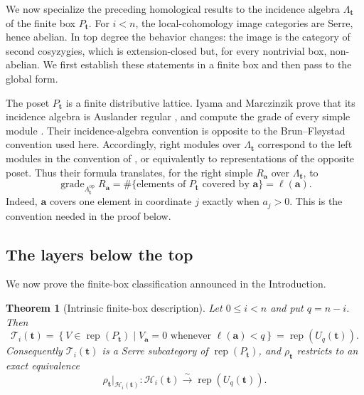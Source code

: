 \documentclass[12pt,reqno]{amsart}
\newtheorem{theorem}{Theorem}[section]
\theoremstyle{definition}
\theoremstyle{remark}
\newcommand{\Rep}{\operatorname{rep}}
\newcommand{\grade}{\operatorname{grade}}
\begin{document}
We now specialize the preceding homological results to the incidence algebra
$\Lambda_{\mathbf t}$ of the finite box $P_{\mathbf t}$.  For $i<n$, the
local-cohomology image categories are Serre, hence abelian.  In top degree the
behavior changes: the image is the category of second cosyzygies, which is
extension-closed but, for every nontrivial box, non-abelian.  We first establish
these statements in a finite box and then pass to the global form.

The poset $P_{\mathbf t}$ is a finite distributive lattice.  Iyama and
Marczinzik prove that its incidence algebra is Auslander regular
\cite[Theorem~3.2]{IM}, and compute the grade of every simple module
\cite[Corollary~3.3]{IM}.  Their incidence-algebra convention is opposite to
the Brun--Fl\o ystad convention used here.  Accordingly, right modules over
$\Lambda_{\mathbf t}$ correspond to the left modules in the convention of
\cite{IM}, or equivalently to representations of the opposite poset.  Thus
their formula translates, for the right simple $R_{\mathbf a}$ over
$\Lambda_{\mathbf t}$, to
\[
\grade_{\Lambda_{\mathbf t}^{\mathrm{op}}}R_{\mathbf a}
=
\#\{\text{elements of $P_{\mathbf t}$ covered by $\mathbf a$}\}
=
\ell(\mathbf a).
\]
Indeed, $\mathbf a$ covers one element in coordinate $j$ exactly when
$a_j>0$.  This is the convention needed in the proof below.

\subsection{The layers below the top}

We now prove the finite-box classification announced in the Introduction.

\begin{theorem}[Intrinsic finite-box description]\label{thm:finite-intrinsic}
Let $0\le i<n$ and put $q=n-i$.  Then
\[
\boxed{
\mathcal T_i(\mathbf t)
=
\left\{
V\in\Rep(P_{\mathbf t})\mid
V_{\mathbf a}=0\text{ whenever }\ell(\mathbf a)<q
\right\}
=
\Rep(U_q(\mathbf t)).
}
\]
Consequently $\mathcal T_i(\mathbf t)$ is a Serre subcategory of $\Rep(P_{\mathbf t})$, and
$\rho_{\mathbf t}$ restricts to an exact equivalence
\[
\rho_{\mathbf t}|_{\mathcal H_i(\mathbf t)}:
\mathcal H_i(\mathbf t)\xrightarrow{\sim}\Rep(U_q(\mathbf t)).
\]
\end{theorem}
\end{document}
